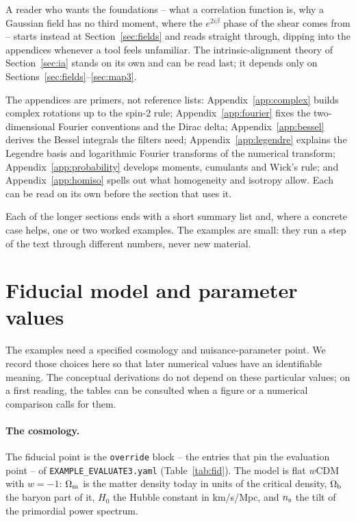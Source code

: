 \documentclass[11pt]{article}
\newcommand{\us}{\_\allowbreak}
\numberwithin{equation}{section}
\begin{document}
A reader who wants the foundations -- what a correlation function is,
why a Gaussian field has no third moment, where the $e^{2i\beta}$
phase of the shear comes from -- starts instead at
Section~\ref{sec:fields} and reads straight through, dipping into the
appendices whenever a tool feels unfamiliar.  The intrinsic-alignment
theory of Section~\ref{sec:ia} stands on its own and can be read
last; it depends only on Sections~\ref{sec:fields}--\ref{sec:map3}.

The appendices are primers, not reference lists:
Appendix~\ref{app:complex} builds complex rotations up to the spin-2
rule; Appendix~\ref{app:fourier} fixes the two-dimensional Fourier
conventions and the Dirac delta; Appendix~\ref{app:bessel} derives
the Bessel integrals the filters need; Appendix~\ref{app:legendre}
explains the Legendre basis and logarithmic Fourier transforms of
the numerical transform; Appendix~\ref{app:probability} develops
moments, cumulants and Wick's rule; and Appendix~\ref{app:homiso}
spells out what homogeneity and isotropy allow.  Each can be read on
its own before the section that uses it.

Each of the longer sections ends with a short summary list and, where
a concrete case helps, one or two worked examples.  The examples are
small: they run a step of the text through different numbers, never
new material.

\section{Fiducial model and parameter values}
\label{sec:fiducial}

The examples need a specified cosmology and nuisance-parameter point.
We record those choices here so that later numerical values have an
identifiable meaning. The conceptual derivations do not depend on these
particular values; on a first reading, the tables can be consulted when
a figure or a numerical comparison calls for them.

\paragraph{The cosmology.}
The fiducial point is the \texttt{override} block -- the entries that
pin the evaluation point -- of \texttt{EXAMPLE\us EVALUATE3.yaml}
(Table~\ref{tab:fid}).  The model is flat $w$CDM with $w = -1$:
$\Omega_{\rm m}$ is the matter density today in units of the critical
density, $\Omega_{\rm b}$ the baryon part of it, $H_0$ the Hubble
constant in km/s/Mpc, and $n_{\rm s}$ the tilt of the primordial
power spectrum.
\end{document}

